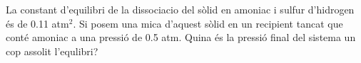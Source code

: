 \begin{exr}
La constant d'equilibri de la dissociacio del  sòlid en amoniac i sulfur d'hidrogen és de 0.11 atm$^2$. Si posem una mica d'aquest sòlid en un recipient tancat que conté amoniac a una pressió de 0.5 atm. Quina és la pressió final del sistema un cop assolit l'equlibri?
\end{exr}